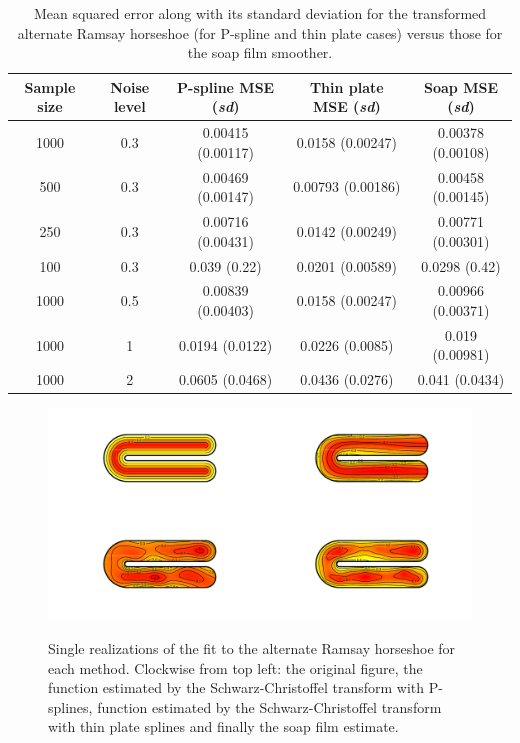 \documentclass[a4paper,10pt]{amsart}
\newcommand{\sch}{Schwarz-Christoffel }
\begin{document}
\begin{table}[ht]
\begin{tabular}{c c c c c}\\
Sample size & Noise level & P-spline MSE (\emph{sd}) & Thin plate MSE (\emph{sd}) & Soap MSE (\emph{sd}) \\
\hline
\hline
1000 & 0.3 & 0.00415 (0.00117) & 0.0158 (0.00247) & 0.00378 (0.00108) \\ 
500 & 0.3 & 0.00469 (0.00147) & 0.00793 (0.00186) & 0.00458 (0.00145) \\ 
250 & 0.3 & 0.00716 (0.00431) & 0.0142 (0.00249) & 0.00771 (0.00301) \\ 
100 & 0.3 & 0.039 (0.22) & 0.0201 (0.00589) & 0.0298 (0.42) \\ 
1000 & 0.5 & 0.00839 (0.00403) & 0.0158 (0.00247) & 0.00966 (0.00371) \\ 
1000 & 1 & 0.0194 (0.0122) & 0.0226 (0.0085) & 0.019 (0.00981) \\ 
1000 & 2 & 0.0605 (0.0468) & 0.0436 (0.0276) & 0.041 (0.0434) \\ 
\end{tabular}
\label{altramsayresultstable}
\caption{Mean squared error along with its standard deviation for the transformed alternate Ramsay horseshoe (for P-spline and thin plate cases) versus those for the soap film smoother.}
\end{table}

\begin{figure}
\centering
\includegraphics[width=5in, trim=0in 0in 0in 0in]{figs/altramsaycomp.pdf}\\
\caption{Single realizations of the fit to the alternate Ramsay horseshoe for each method. Clockwise from top left: the original figure, the function estimated by the \sch transform with P-splines, function estimated by the \sch transform with thin plate splines and finally the soap film estimate.}
\label{altramsaycomp}
\end{figure}
\end{document}
